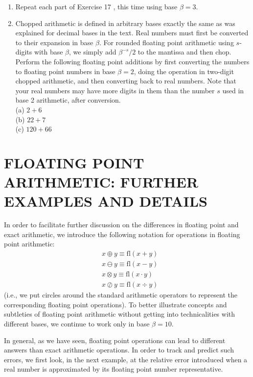 \documentclass[../main.tex]{subfiles}
\begin{document}
\begin{enumerate}
\item Repeat each part of Exercise 17 , this time using base $\beta=3$.

\item Chopped arithmetic is defined in arbitrary bases exactly the same as was explained for decimal bases in the text. Real numbers must first be converted to their expansion in base $\beta$. For rounded floating point arithmetic using $s$-digits with base $\beta$, we simply add $\beta^{-s} / 2$ to the mantissa and then chop. Perform the following floating point additions by first converting the numbers to floating point numbers in base $\beta=2$, doing the operation in two-digit chopped arithmetic, and then converting back to real numbers. Note that your real numbers may have more digits in them than the number $s$ used in base 2 arithmetic, after conversion.\\
(a) $2+6$\\
(b) $22+7$\\
(c) $120+66$

\end{enumerate}

\section{FLOATING POINT ARITHMETIC: FURTHER EXAMPLES AND DETAILS}

In order to facilitate further discussion on the differences in floating point and exact arithmetic, we introduce the following notation for operations in floating point arithmetic:
$$
\begin{aligned}
&x \oplus y \equiv \mathrm{fl}(x+y) \\
&x \ominus y \equiv \mathrm{fl}(x-y) \\
&x \otimes y \equiv \mathrm{fl}(x \cdot y) \\
&x \oslash y \equiv \mathrm{fl}(x \div y)
\end{aligned}
$$
(i.e., we put circles around the standard arithmetic operators to represent the corresponding floating point operations). To better illustrate concepts and subtleties of floating point arithmetic without getting into technicalities with different bases, we continue to work only in base $\beta=10$.


In general, as we have seen, floating point operations can lead to different answers than exact arithmetic operations. In order to track and predict such errors, we first look, in the next example, at the relative error introduced when a real number is approximated by its floating point number representative.
\end{document}

